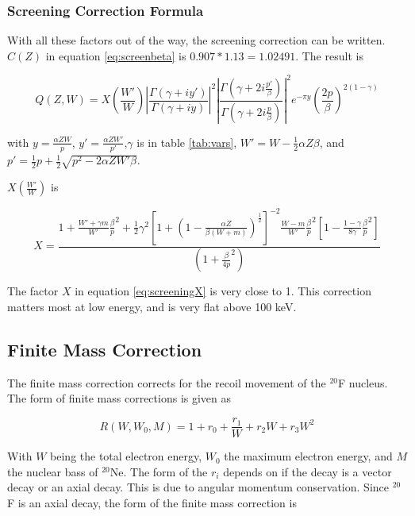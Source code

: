 \documentclass[../MaxHughesThesis.tex]{subfiles}
\begin{document}
\subsubsection{Screening Correction Formula}
With all these factors out of the way, the screening correction can be written.
$C(Z)$ in equation \ref{eq:screenbeta} is $0.907 * 1.13 = 1.02491$.
The result is \cite{Buh84} %

\begin{equation}
	Q(Z,W) = X(\frac{W'}{W})|\frac{\Gamma(\gamma + i y')}{\Gamma(\gamma+ i y)}|^{2}|\frac{\Gamma(\gamma + 2 i \frac{p'}{\beta})}{\Gamma(\gamma + 2 i \frac{p}{\beta})}|^{2}e^{-\pi y}(\frac{2p}{\beta})^{2(1 - \gamma)}
	\label{eq:screeningQ}
\end{equation}

with $y = \frac{\alpha Z W}{p}$, $y' = \frac{\alpha Z W'}{p'}$,$ \gamma$ is in table \ref{tab:vars}, $W' = W - \frac{1}{2}\alpha Z \beta$, and $p' = \frac{1}{2}p + \frac{1}{2}\sqrt{p^{2} - 2 \alpha Z W' \beta}$.

$X(\frac{W'}{W})$ is %

\begin{equation}
	X = \frac{1 + \frac{W' + \gamma m}{W'} \frac{\beta}{p}^{2} + \frac{1}{2}\gamma^{2}[1 + (1 - \frac{\alpha Z}{\beta(W + m)})^{\frac{1}{2}}]^{-2}\frac{W - m}{W'} \frac{\beta}{p}^{2}[1 - \frac{1 - \gamma}{8\gamma}\frac{\beta}{p}^{2}]}{(1 + \frac{\beta}{4p}^{2})}
	\label{eq:screeningX}
\end{equation}

The factor $X$ in equation \ref{eq:screeningX} is very close to 1.
This correction matters most at low energy, and is very flat above 100 keV.

\subsection{Finite Mass Correction}
The finite mass correction corrects for the recoil movement of the $^{20}$F nucleus.
The form of finite mass corrections is given as \cite{WIL90} %

\begin{equation}
	R(W,W_{0},M) = 1 + r_{0} + \frac{r_{1}}{W} + r_{2}W + r_{3}W^{2}
	\label{eq:finitemass}
\end{equation}

With $W$ being the total electron energy, $W_{0}$ the maximum electron energy,  and $M$ the nuclear bass of $^{20}$Ne.
The form of the $r_{i}$ depends on if the decay is a vector decay or an axial decay. 
This is due to angular momentum conservation.
Since $^{20}$F is an axial decay, the form of the finite mass correction is %
\end{document}
